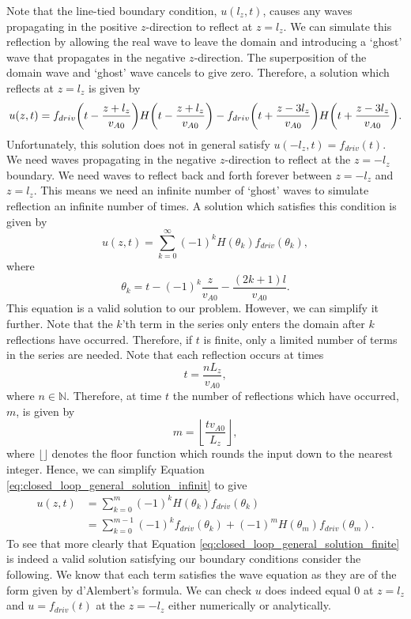 Note that the line-tied boundary condition, $u(l_z,t)$, causes any waves propagating in the positive $z$-direction to reflect at $z=l_z$. We can simulate this reflection by allowing the real wave to leave the domain and introducing a `ghost' wave that propagates in the negative $z$-direction. The superposition of the domain wave and `ghost' wave cancels to give zero. Therefore, a solution which reflects at $z=l_z$ is given by
\[u(z,t) = f_{driv}\qty(t - \frac{z+l_z}{v_{A0}})H\qty(t - \frac{z+l_z}{v_{A0}}) - f_{driv}\qty(t + \frac{z-3l_z}{v_{A0}})H\qty(t + \frac{z-3l_z}{v_{A0}}).\]
Unfortunately, this solution does not in general satisfy $u(-l_z,t)=f_{driv}(t)$. We need waves propagating in the negative $z$-direction to reflect at the $z=-l_z$ boundary. We need waves to reflect back and forth forever between $z=-l_z$ and $z=l_z$. This means we need an infinite number of `ghost' waves to simulate reflection an infinite number of times. A solution which satisfies this condition is given by
\begin{equation}
    \label{eq:closed_loop_general_solution_infinit}
    u(z,t) = \sum_{k=0}^\infty(-1)^kH(\theta_k)f_{driv}(\theta_k),
\end{equation}
where
\begin{equation}
    \label{eq:theta_k}
    \theta_k=t-(-1)^k\frac{z}{v_{A0}}-\frac{(2k+1)l}{v_{A0}}.
\end{equation}
This equation is a valid solution to our problem. However, we can simplify it further. Note that the $k$'th term in the series only enters the domain after $k$ reflections have occurred. Therefore, if $t$ is finite, only a limited number of terms in the series are needed. Note that each reflection occurs at times
\begin{equation}
    t = \frac{n L_z}{v_{A0}},
\end{equation}
where $n\in\mathds{N}$. Therefore, at time $t$ the number of reflections which have occurred, $m$, is given by
\begin{equation}
    \label{eq:m}
    m = \left\lfloor\frac{t v_{A0}}{L_z}\right\rfloor,
\end{equation}
where $\lfloor \rfloor$ denotes the floor function which rounds the input down to the nearest integer. Hence, we can simplify Equation \eqref{eq:closed_loop_general_solution_infinit} to give
\begin{equation}
    \label{eq:closed_loop_general_solution_finite}
    \begin{aligned}
    u(z,t) &= \sum_{k=0}^m(-1)^kH(\theta_k)f_{driv}(\theta_k) \\
    &= \sum_{k=0}^{m-1}(-1)^kf_{driv}(\theta_k) + (-1)^mH(\theta_m)f_{driv}(\theta_m).
    \end{aligned}
\end{equation}
To see that more clearly that Equation \eqref{eq:closed_loop_general_solution_finite} is indeed a valid solution satisfying our boundary conditions consider the following. We know that each term satisfies the wave equation as they are of the form given by d'Alembert's formula. We can check $u$ does indeed equal 0 at $z=l_z$ and $u=f_{driv}(t)$ at the $z=-l_z$ either numerically or analytically.

